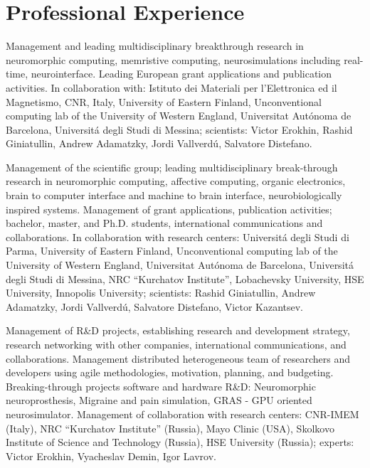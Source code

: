 \documentclass{moderncv}
\begin{document}
    \section{Professional Experience}

            {Management and leading multidisciplinary breakthrough research in neuromorphic computing, memristive computing, neurosimulations including real-time, neurointerface. Leading European grant applications and publication activities. In collaboration with: Istituto dei Materiali per l'Elettronica ed il Magnetismo, CNR, Italy, University of Eastern Finland, Unconventional computing lab of the University of Western England, Universitat Aut\'onoma de Barcelona, Universit\'{a} degli Studi di Messina; scientists: Victor Erokhin, Rashid Giniatullin, Andrew Adamatzky, Jordi Vallverd\'{u}, Salvatore Distefano.}
    
    {Management of the scientific group; leading multidisciplinary break-through research in neuromorphic computing, affective computing, organic electronics, brain to computer interface and machine to brain interface, neurobiologically inspired systems. Management of grant applications, publication activities; bachelor, master, and Ph.D. students, international communications and collaborations. In collaboration with research centers: Universit\'{a} degli Studi di Parma, University of Eastern Finland, Unconventional computing lab of the University of Western England, Universitat Aut\'onoma de Barcelona, Universit\'{a} degli Studi di Messina, NRC “Kurchatov Institute”, Lobachevsky University, HSE University, Innopolis University; scientists: Rashid Giniatullin, Andrew Adamatzky, Jordi Vallverd\'{u}, Salvatore Distefano, Victor Kazantsev.}

    {Management of R\&D projects, establishing research and development strategy, research networking with other companies, international communications, and collaborations. Management distributed heterogeneous team of researchers and developers using agile methodologies, motivation, planning, and budgeting. Breaking-through projects software and hardware R\&D: Neuromorphic neuroprosthesis, Migraine and pain simulation, GRAS - GPU oriented neurosimulator. Management of collaboration with research centers: CNR-IMEM (Italy), NRC “Kurchatov Institute” (Russia), Mayo Clinic (USA), Skolkovo Institute of Science and Technology (Russia), HSE University (Russia); experts: Victor Erokhin, Vyacheslav Demin, Igor Lavrov. }
\end{document}
